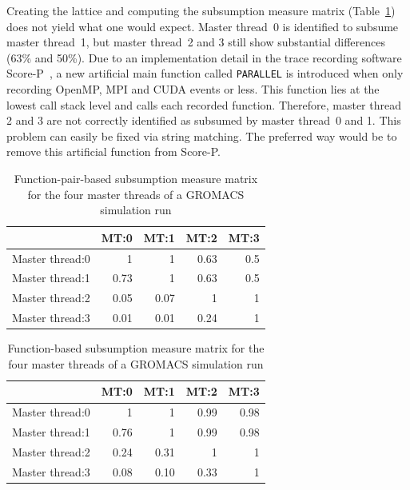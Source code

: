 \documentclass[a4paper, final, diplominf]{zih-template}
\begin{document}
Creating the lattice and computing the subsumption measure matrix (Table~\ref{tab:gromacs-m-subsumption-measure-matrix}) does not yield what one would expect.
Master thread~0 is identified to subsume master thread~1, but master thread~2 and 3 still show substantial differences (63\% and 50\%).
Due to an implementation detail in the trace recording software Score-P~\cite{scorep10}, a new artificial main function called \texttt{PARALLEL} is introduced when only recording OpenMP, MPI and CUDA events or less.
This function lies at the lowest call stack level and calls each recorded function.
Therefore, master thread 2 and 3 are not correctly identified as subsumed by master thread~0 and 1.
This problem can easily be fixed via string matching.
The preferred way would be to remove this artificial function from Score-P.
\begin{table}[tb]
	\centering
	\caption{Function-pair-based subsumption measure matrix for the four master threads of a GROMACS simulation run}
	\vspace{0.2cm}
	\begin{tabular}{r | r r r r}
						& MT:0 & MT:1 & MT:2 & MT:3 \\
		\hline
		Master thread:0 & 1    & 1    & 0.63 & 0.5  \\
		Master thread:1 & 0.73 & 1    & 0.63 & 0.5  \\
		Master thread:2 & 0.05 & 0.07 & 1    & 1    \\
		Master thread:3 & 0.01 & 0.01 & 0.24 & 1    \\
	\end{tabular}
	\label{tab:gromacs-m-subsumption-measure-matrix}
\end{table}
\begin{table}[tb]
	\centering
	\caption{Function-based subsumption measure matrix for the four master threads of a GROMACS simulation run}
	\vspace{0.2cm}
	\begin{tabular}{r | r r r r}
						& MT:0 & MT:1 & MT:2 & MT:3 \\
		\hline
		Master thread:0 & 1    & 1    & 0.99 & 0.98 \\
		Master thread:1 & 0.76 & 1    & 0.99 & 0.98 \\
		Master thread:2 & 0.24 & 0.31 & 1    & 1    \\
		Master thread:3 & 0.08 & 0.10 & 0.33 & 1    \\
	\end{tabular}
	\label{tab:gromacs-l-subsumption-measure-matrix}
\end{table}
\end{document}
